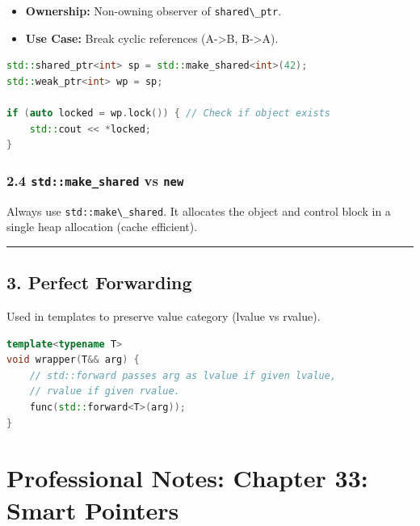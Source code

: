 \begin{itemize}
\tightlist
\item
  \textbf{Ownership:} Non-owning observer of
  \passthrough{\lstinline!shared\_ptr!}.
\item
  \textbf{Use Case:} Break cyclic references (A-\textgreater B,
  B-\textgreater A).
\end{itemize}

\begin{lstlisting}[language={C++}]
std::shared_ptr<int> sp = std::make_shared<int>(42);
std::weak_ptr<int> wp = sp;

if (auto locked = wp.lock()) { // Check if object exists
    std::cout << *locked;
}
\end{lstlisting}

\hypertarget{stdmake_shared-vs-new}{%
\subsection{\texorpdfstring{2.4 \texttt{std::make\_shared} vs
\texttt{new}}{2.4 std::make\_shared vs new}}\label{stdmake_shared-vs-new}}

Always use \passthrough{\lstinline!std::make\_shared!}. It allocates the
object and control block in a single heap allocation (cache efficient).

\begin{center}\rule{0.5\linewidth}{0.5pt}\end{center}

\hypertarget{perfect-forwarding}{%
\section{3. Perfect Forwarding}\label{perfect-forwarding}}

Used in templates to preserve value category (lvalue vs rvalue).

\begin{lstlisting}[language={C++}]
template<typename T>
void wrapper(T&& arg) {
    // std::forward passes arg as lvalue if given lvalue,
    // rvalue if given rvalue.
    func(std::forward<T>(arg)); 
}
\end{lstlisting}

\hypertarget{professional-notes-chapter-33-smart-pointers}{%
\chapter{Professional Notes: Chapter 33: Smart
Pointers}\label{professional-notes-chapter-33-smart-pointers}}

